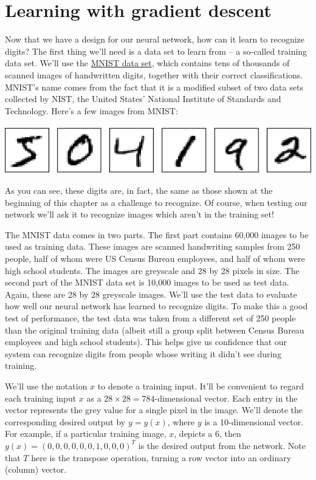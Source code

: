 \documentclass[a4paper,twoside,10pt]{book}
\begin{document}
\section{Learning with gradient descent}
\label{sec:1.5}
Now that we have a design for our neural network, how can it learn to recognize digits? The first thing we'll need is a data set to learn from -- a so-called training data set. We'll use the \href{http://yann.lecun.com/exdb/mnist/}{MNIST data set}, which contains tens of thousands of scanned images of handwritten digits, together with their correct classifications. MNIST's name comes from the fact that it is a modified subset of two data sets collected by NIST, the United States' National Institute of Standards and Technology. Here's a few images from MNIST:
\begin{center}
	\includegraphics[scale=0.4]{./figures/ch1/digits_separate}
\end{center}
As you can see, these digits are, in fact, the same as those shown at the beginning of this chapter as a challenge to recognize. Of course, when testing our network we'll ask it to recognize images which aren't in the training set!

The MNIST data comes in two parts. The first part contains 60,000 images to be used as training data. These images are scanned handwriting samples from 250 people, half of whom were US Census Bureau employees, and half of whom were high school students. The images are greyscale and 28 by 28 pixels in size. The second part of the MNIST data set is 10,000 images to be used as test data. Again, these are 28 by 28 greyscale images. We'll use the test data to evaluate how well our neural network has learned to recognize digits. To make this a good test of performance, the test data was taken from a different set of 250 people than the original training data (albeit still a group split between Census Bureau employees and high school students). This helps give us confidence that our system can recognize digits from people whose writing it didn't see during training.

We'll use the notation $x$ to denote a training input. It'll be convenient to regard each training input $x$ as a $28\times28=784$-dimensional vector. Each entry in the vector represents the grey value for a single pixel in the image. We'll denote the corresponding desired output by $y=y(x)$, where $y$ is a 10-dimensional vector. For example, if a particular training image, $x$, depicts a 6, then $y(x)=(0,0,0,0,0,0,1,0,0,0)^T$ is the desired output from the network. Note that $T$ here is the transpose operation, turning a row vector into an ordinary (column) vector.
\end{document}
